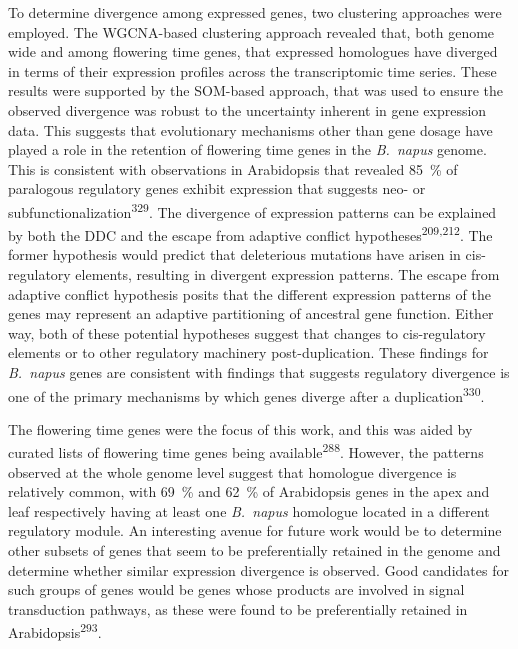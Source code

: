\documentclass[12pt,]{book}
\begin{document}
To determine divergence among expressed genes, two clustering approaches
were employed. The WGCNA-based clustering approach revealed that, both
genome wide and among flowering time genes, that expressed homologues
have diverged in terms of their expression profiles across the
transcriptomic time series. These results were supported by the
SOM-based approach, that was used to ensure the observed divergence was
robust to the uncertainty inherent in gene expression data. This
suggests that evolutionary mechanisms other than gene dosage have played
a role in the retention of flowering time genes in the \emph{B.~napus}
genome. This is consistent with observations in Arabidopsis that
revealed 85~\% of paralogous regulatory genes exhibit expression that
suggests neo- or subfunctionalization\textsuperscript{329}. The
divergence of expression patterns can be explained by both the DDC and
the escape from adaptive conflict hypotheses\textsuperscript{209,212}.
The former hypothesis would predict that deleterious mutations have
arisen in cis-regulatory elements, resulting in divergent expression
patterns. The escape from adaptive conflict hypothesis posits that the
different expression patterns of the genes may represent an adaptive
partitioning of ancestral gene function. Either way, both of these
potential hypotheses suggest that changes to cis-regulatory elements or
to other regulatory machinery post-duplication. These findings for
\emph{B.~napus} genes are consistent with findings that suggests
regulatory divergence is one of the primary mechanisms by which genes
diverge after a duplication\textsuperscript{330}.

The flowering time genes were the focus of this work, and this was aided
by curated lists of flowering time genes being
available\textsuperscript{288}. However, the patterns observed at the
whole genome level suggest that homologue divergence is relatively
common, with 69~\% and 62~\% of Arabidopsis genes in the apex and leaf
respectively having at least one \emph{B.~napus} homologue located in a
different regulatory module. An interesting avenue for future work would
be to determine other subsets of genes that seem to be preferentially
retained in the genome and determine whether similar expression
divergence is observed. Good candidates for such groups of genes would
be genes whose products are involved in signal transduction pathways, as
these were found to be preferentially retained in
Arabidopsis\textsuperscript{293}.
\end{document}
